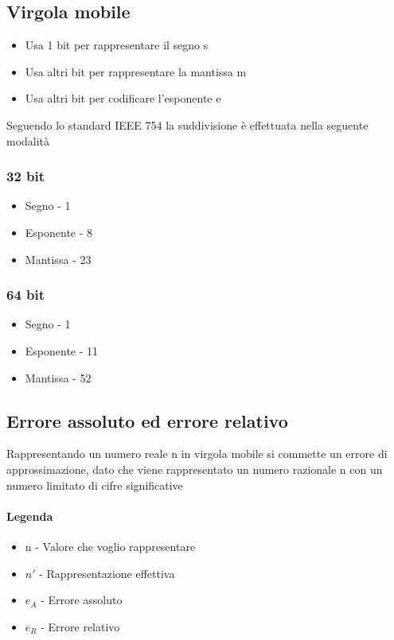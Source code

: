 \documentclass[12pt, a4paper, openany]{book}
\begin{document}
\subsection{Virgola mobile}
\begin{itemize}
    \item Usa 1 bit per rappresentare il segno s
    \item Usa altri bit per rappresentare la mantissa m
    \item Usa altri bit per codificare l'esponente e
\end{itemize}

Seguendo lo standard IEEE 754 la suddivisione è effettuata nella seguente modalità
\subsubsection{32 bit}
\begin{itemize}
    \item Segno - 1
    \item Esponente - 8
    \item Mantissa - 23
\end{itemize}
\subsubsection{64 bit}
\begin{itemize}
    \item Segno - 1
    \item Esponente - 11
    \item Mantissa - 52
\end{itemize}

\subsection{Errore assoluto ed errore relativo}
Rappresentando un numero reale n in virgola mobile si commette un errore di approssimazione,
dato che viene rappresentato un numero razionale n con un numero limitato di cifre significative
\paragraph*{Legenda}
\begin{itemize}
    \item n - Valore che voglio rappresentare
    \item $n'$ - Rappresentazione effettiva
    \item $e_A$ - Errore assoluto
    \item $e_R$ - Errore relativo
\end{itemize}
\end{document}
